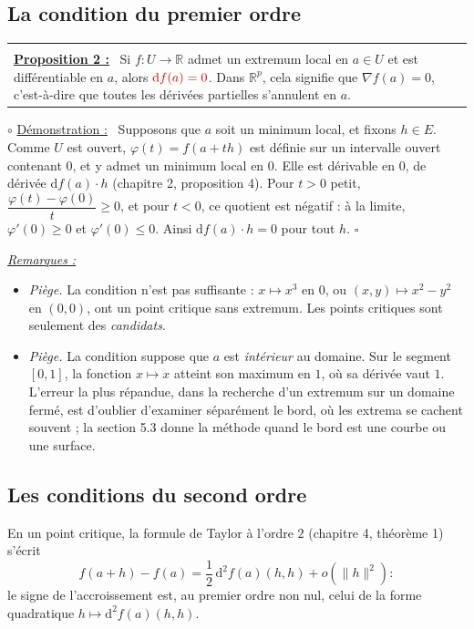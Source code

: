 \documentclass[a4paper,twoside]{report}
\makeatletter
\newcommand{\rmath}[1]{\textcolor{rougecours}{#1}}
\newenvironment{cadre}%
 {\par\vspace{2mm}\noindent\begin{tabular}{|@{\hspace{4mm}}p{0.93\textwidth}@{\hspace{4mm}}|}
  \hline \\[-2mm]}%
 {\\[2mm] \hline \end{tabular}\par\vspace{3mm}}
\newcommand{\propo}[1]{\textbf{\underline{Proposition #1 :}}~}
\newenvironment{demo}%
 {\par\needspace{4\baselineskip}\vspace{1mm}\noindent$\circ$ \underline{Démonstration :}~\setlength{\parskip}{3pt plus 1pt}}%
 {\hfill$\square$\par\vspace{2mm}}
\newenvironment{remarques}%
 {\par\needspace{6\baselineskip}\vspace{1mm}\begin{list}{}{\leftmargin=1cm \rightmargin=0.5cm}\item[]%
  \textit{\underline{Remarques :}}%
  \begin{itemize}[label=$\bullet$,leftmargin=0.45cm,topsep=3pt,itemsep=4pt]}%
 {\end{itemize}\end{list}\vspace{1mm}}
\newcommand{\R}{\mathbb{R}}
\newcommand{\dd}{\mathrm{d}}                      %
\newcommand{\norme}[1]{\lVert #1 \rVert}         %
\newcommand{\grad}{\nabla}                        %
\makeatother
\begin{document}
\subsection{La condition du premier ordre}

\begin{cadre}
\propo{2} Si $f : U \to \R$ admet un extremum local en $a \in U$ et est différentiable en $a$, alors $\rmath{\dd f(a) = 0}$. Dans $\R^{p}$, cela signifie que $\grad f(a) = 0$, c'est-à-dire que toutes les dérivées partielles s'annulent en $a$.
\end{cadre}

\begin{demo}
Supposons que $a$ soit un minimum local, et fixons $h \in E$. Comme $U$ est ouvert, $\varphi(t) = f(a + th)$ est définie sur un intervalle ouvert contenant $0$, et y admet un minimum local en $0$. Elle est dérivable en $0$, de dérivée $\dd f(a)\cdot h$ (chapitre 2, proposition 4). Pour $t > 0$ petit, $\dfrac{\varphi(t) - \varphi(0)}{t} \geqslant 0$, et pour $t < 0$, ce quotient est négatif : à la limite, $\varphi'(0) \geqslant 0$ et $\varphi'(0) \leqslant 0$. Ainsi $\dd f(a)\cdot h = 0$ pour tout $h$.
\end{demo}

\begin{remarques}
  \item \emph{Piège.} La condition n'est pas suffisante : $x \mapsto x^{3}$ en $0$, ou $(x, y) \mapsto x^{2} - y^{2}$ en $(0, 0)$, ont un point critique sans extremum. Les points critiques sont seulement des \emph{candidats}.
  \item \emph{Piège.} La condition suppose que $a$ est \emph{intérieur} au domaine. Sur le segment $[0, 1]$, la fonction $x \mapsto x$ atteint son maximum en $1$, où sa dérivée vaut $1$. L'erreur la plus répandue, dans la recherche d'un extremum sur un domaine fermé, est d'oublier d'examiner séparément le bord, où les extrema se cachent souvent ; la section 5.3 donne la méthode quand le bord est une courbe ou une surface.
\end{remarques}

\subsection{Les conditions du second ordre}

En un point critique, la formule de Taylor à l'ordre $2$ (chapitre 4, théorème 1) s'écrit
\[ f(a + h) - f(a) = \frac{1}{2}\,\dd^{2} f(a)(h, h) + o(\norme{h}^{2}) : \]
le signe de l'accroissement est, au premier ordre non nul, celui de la forme quadratique $h \mapsto \dd^{2} f(a)(h, h)$.
\end{document}
